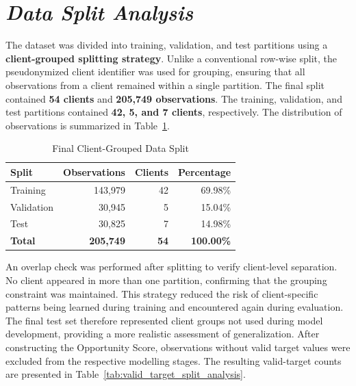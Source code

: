 \documentclass[12pt,a4paper]{report}
\begin{document}
\section{\textit{Data Split Analysis}}

The dataset was divided into training, validation, and test partitions using a \textbf{client-grouped splitting strategy}. Unlike a conventional row-wise split, the pseudonymized client identifier was used for grouping, ensuring that all observations from a client remained within a single partition. The final split contained \textbf{54 clients} and \textbf{205,749 observations}. The training, validation, and test partitions contained \textbf{42, 5, and 7 clients}, respectively. The distribution of observations is summarized in Table~\ref{tab:data_split_analysis}.

\begin{table}[htbp]
\centering
\caption{Final Client-Grouped Data Split}
\label{tab:data_split_analysis}
\begin{tabular}{|l|r|r|r|}
\hline
\textbf{Split} & \textbf{Observations} & \textbf{Clients} & \textbf{Percentage} \\
\hline
Training & 143,979 & 42 & 69.98\% \\
\hline
Validation & 30,945 & 5 & 15.04\% \\
\hline
Test & 30,825 & 7 & 14.98\% \\
\hline
\textbf{Total} & \textbf{205,749} & \textbf{54} & \textbf{100.00\%} \\
\hline
\end{tabular}
\end{table}

An overlap check was performed after splitting to verify client-level separation. No client appeared in more than one partition, confirming that the grouping constraint was maintained. This strategy reduced the risk of client-specific patterns being learned during training and encountered again during evaluation. The final test set therefore represented client groups not used during model development, providing a more realistic assessment of generalization. After constructing the Opportunity Score, observations without valid target values were excluded from the respective modelling stages. The resulting valid-target counts are presented in Table~\ref{tab:valid_target_split_analysis}.
\end{document}
